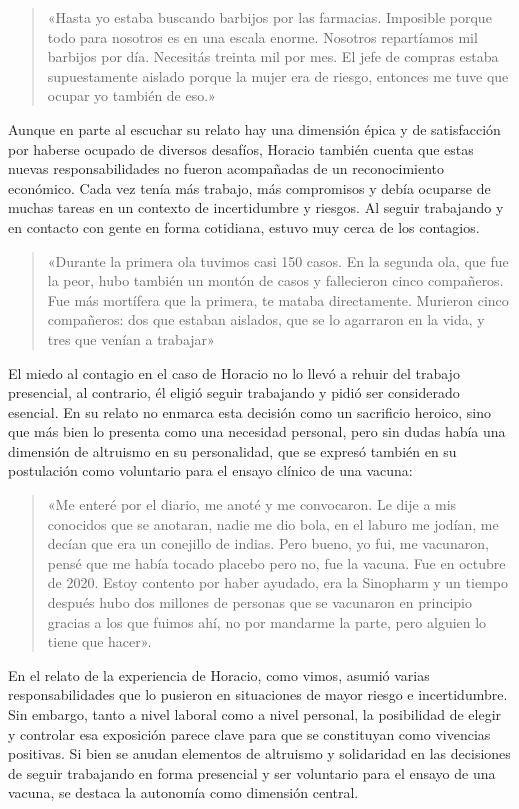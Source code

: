 \begin{quote}
«Hasta yo estaba buscando barbijos por las farmacias. Imposible porque todo para nosotros es en una escala enorme. Nosotros repartíamos mil barbijos por día. Necesitás treinta mil por mes. El jefe de compras estaba supuestamente aislado porque la mujer era de riesgo, entonces me tuve que ocupar yo también de eso.»
\end{quote}

Aunque en parte al escuchar su relato hay una dimensión épica y de satisfacción por haberse ocupado de diversos desafíos, Horacio también cuenta que estas nuevas responsabilidades no fueron acompañadas de un reconocimiento económico. Cada vez tenía más trabajo, más compromisos y debía ocuparse de muchas tareas en un contexto de incertidumbre y riesgos. Al seguir trabajando y en contacto con gente en forma cotidiana, estuvo muy cerca de los contagios.

\begin{quote}
«Durante la primera ola tuvimos casi 150 casos. En la segunda ola, que fue la peor, hubo también un montón de casos y fallecieron cinco compañeros. Fue más mortífera que la primera, te mataba directamente. Murieron cinco compañeros: dos que estaban aislados, que se lo agarraron en la vida, y tres que venían a trabajar»
\end{quote}

El miedo al contagio en el caso de Horacio no lo llevó a rehuir del trabajo presencial, al contrario, él eligió seguir trabajando y pidió ser considerado esencial. En su relato no enmarca esta decisión como un sacrificio heroico, sino que más bien lo presenta como una necesidad personal, pero sin dudas había una dimensión de altruismo en su personalidad, que se expresó también en su postulación como voluntario para el ensayo clínico de una vacuna:

\begin{quote}
«Me enteré por el diario, me anoté y me convocaron. Le dije a mis conocidos que se anotaran, nadie me dio bola, en el laburo me jodían, me decían que era un conejillo de indias. Pero bueno, yo fui, me vacunaron, pensé que me había tocado placebo pero no, fue la vacuna. Fue en octubre de 2020. Estoy contento por haber ayudado, era la Sinopharm y un tiempo después hubo dos millones de personas que se vacunaron en principio gracias a los que fuimos ahí, no por mandarme la parte, pero alguien lo tiene que hacer».
\end{quote}

En el relato de la experiencia de Horacio, como vimos, asumió varias responsabilidades que lo pusieron en situaciones de mayor riesgo e incertidumbre. Sin embargo, tanto a nivel laboral como a nivel personal, la posibilidad de elegir y controlar esa exposición parece clave para que se constituyan como vivencias positivas. Si bien se anudan elementos de altruismo y solidaridad en las decisiones de seguir trabajando en forma presencial y ser voluntario para el ensayo de una vacuna, se destaca la autonomía como dimensión central.

